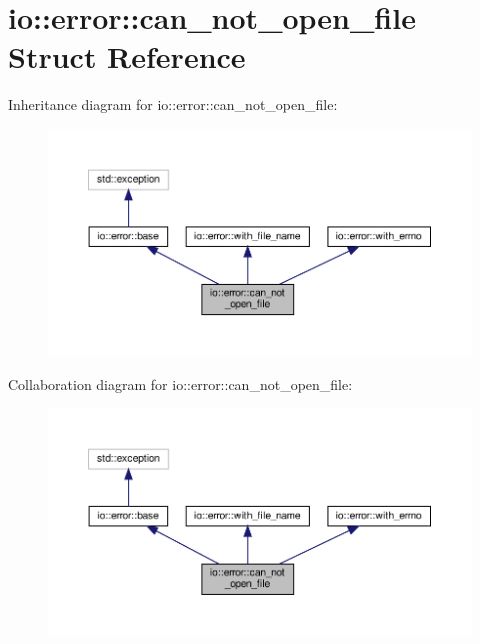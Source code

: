 \hypertarget{structio_1_1error_1_1can__not__open__file}{}\section{io\+:\+:error\+:\+:can\+\_\+not\+\_\+open\+\_\+file Struct Reference}
\label{structio_1_1error_1_1can__not__open__file}


Inheritance diagram for io\+:\+:error\+:\+:can\+\_\+not\+\_\+open\+\_\+file\+:\nopagebreak
\begin{figure}[H]
\begin{center}
\leavevmode
\includegraphics[width=350pt]{structio_1_1error_1_1can__not__open__file__inherit__graph}
\end{center}
\end{figure}


Collaboration diagram for io\+:\+:error\+:\+:can\+\_\+not\+\_\+open\+\_\+file\+:\nopagebreak
\begin{figure}[H]
\begin{center}
\leavevmode
\includegraphics[width=350pt]{structio_1_1error_1_1can__not__open__file__coll__graph}
\end{center}
\end{figure}
